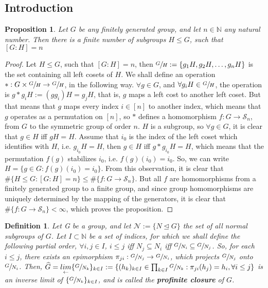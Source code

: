 \documentclass[12pt]{article}
\newtheorem{proposition}[theorem]{Proposition}
\newtheorem{definition}[theorem]{Definition}
\begin{document}
\subsection{Introduction}
\begin{proposition} \label{prop:finite.number.subgroups}
Let $G$ be any finitely generated group, and let $n\in\mathbb{N}$ any natural number. Then there is a finite number of subgroups $H\leq G$, such that $[G:H]=n$
\end{proposition}
\begin{proof}
Let $H\leq G$, such that $[G:H]=n$, then $\sfrac{G}{H}:=\{g_1H,g_2H,\dots,g_nH\}$ is the set containing all left cosets of $H$. We shall define an operation $*:G\times\sfrac{G}{H}\rightarrow \sfrac{G}{H}$, in the following way. $\forall g\in G$, and $\forall g_iH\in\sfrac{G}{H}$, the operation is $g*g_iH:=(gg_i)H=g_jH$, that is, $g$ maps a left cost to another left coset. But that means that $g$ maps every index $i\in [n]$ to another index, which means that $g$ operates as a permutation on $[n]$, so $*$ defines a homomorphism $f:G\rightarrow\mathcal{S}_n$, from $G$ to the symmetric group of order $n$. $H$ is a subgroup, so $\forall g\in G$, it is clear that $g\in H$ iff $gH=H$. Assume that $i_0$  is the index of the left coset which identifies with $H$, i.e. $g_{i_0}H=H$, then $g\in H$ iff $g*g_{i_0}H=H$, which means that the permutation $f(g)$ stabilizes $i_0$, i.e. $f(g)(i_0)=i_0$. So, we can write $H=\{g\in G : f(g)(i_0)=i_0\}$. From this observation, it is clear that $\#\{H\leq G : [G:H]=n\}\leq\#\{f:G\rightarrow \mathcal{S}_n\}$. But all $f$ are homomorphisms from a finitely generated group to a finite group, and since group homomorphisms are uniquely determined by the mapping of the generators, it is clear that $\#\{f:G\rightarrow \mathcal{S}_n\}<\infty$, which proves the proposition.
\end{proof}
\begin{definition}
\label{def:inverse.limit}
Let G be a group, and let $\mathcal{N}:=\{N\trianglelefteq G\}$ the set of all normal subgroups of $G$. Let $I\subset\mathbb{N}$ be a set of indices, for which we shall define the following partial order, $\forall i,j\in I$, $i\leq j$ iff $N_j\subseteq N_i$ iff $\sfrac{G}{N_i}\subseteq\sfrac{G}{N_j}$. So, for each $i\leq j$, there exists an epimorphism $\pi_{ji}:\sfrac{G}{N_
j}\rightarrow\sfrac{G}{N_i}$, which projects $\sfrac{G}{N_
j}$ onto $\sfrac{G}{N_
i}$. Then, $\widehat{G}=\underset{\leftarrow}{lim}\{\sfrac{G}{N_k}\}_{k\in I}:=\{(h_k)_{k\in I}\in\prod_{k\in I}\sfrac{G}{N_k} : \pi_{ji}(h_j)=h_i,\forall i\leq j\}$ is an inverse limit of $\{\sfrac{G}{N_k}\}_{k\in I}$, and is called the \textbf{profinite closure} of $G$.
\end{definition}
\end{document}
